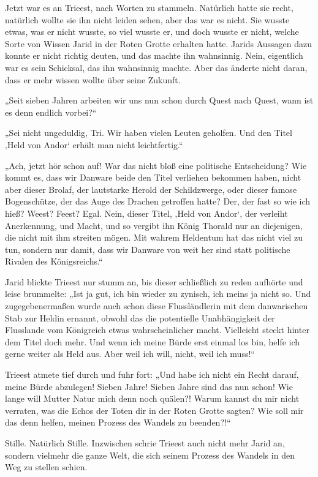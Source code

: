 Jetzt war es an Trieest, nach Worten zu stammeln. Natürlich hatte sie recht, natürlich wollte sie ihn nicht leiden sehen, aber das war es nicht. Sie wusste etwas, was er nicht wusste, so viel wusste er, und doch wusste er nicht, welche Sorte von Wissen Jarid in der Roten Grotte erhalten hatte. Jarids Aussagen dazu konnte er nicht richtig deuten, und das machte ihn wahnsinnig. Nein, eigentlich war es sein Schicksal, das ihn wahnsinnig machte. Aber das änderte nicht daran, dass er mehr wissen wollte über seine Zukunft.

„Seit sieben Jahren arbeiten wir uns nun schon durch Quest nach Quest, wann ist es denn endlich vorbei?“

„Sei nicht ungeduldig, Tri. Wir haben vielen Leuten geholfen. Und den Titel ‚Held von Andor‘ erhält man nicht leichtfertig.“

„Ach, jetzt hör schon auf! War das nicht bloß eine politische Entscheidung? Wie kommt es, dass wir Danware beide den Titel verliehen bekommen haben, nicht aber dieser Brolaf, der lautstarke Herold der Schildzwerge, oder dieser famose Bogenschütze, der das Auge des Drachen getroffen hatte? Der, der fast so wie ich hieß? Weest? Feest? Egal. Nein, dieser Titel, ‚Held von Andor‘, der verleiht Anerkennung, und Macht, und so vergibt ihn König Thorald nur an diejenigen, die nicht mit ihm streiten mögen. Mit wahrem Heldentum hat das nicht viel zu tun, sondern nur damit, dass wir Danware von weit her sind statt politische Rivalen des Königsreichs.“

Jarid blickte Trieest nur stumm an, bis dieser schließlich zu reden aufhörte und leise brummelte: „Ist ja gut, ich bin wieder zu zynisch, ich meins ja nicht so. Und zugegebenermaßen wurde auch schon diese Flussländlerin mit dem danwarischen Stab zur Heldin ernannt, obwohl das die potentielle Unabhängigkeit der Flusslande vom Königreich etwas wahrscheinlicher macht. Vielleicht steckt hinter dem Titel doch mehr. Und wenn ich meine Bürde erst einmal los bin, helfe ich gerne weiter als Held aus. Aber weil ich will, nicht, weil ich muss!“

Trieest atmete tief durch und fuhr fort: „Und habe ich nicht ein Recht darauf, meine Bürde abzulegen! Sieben Jahre! Sieben Jahre sind das nun schon! Wie lange will Mutter Natur mich denn noch quälen?! Warum kannst du mir nicht verraten, was die Echos der Toten dir in der Roten Grotte sagten? Wie soll mir das denn helfen, meinen Prozess des Wandels zu beenden?!“

Stille. Natürlich Stille. Inzwischen schrie Trieest auch nicht mehr Jarid an, sondern vielmehr die ganze Welt, die sich seinem Prozess des Wandels in den Weg zu stellen schien.

